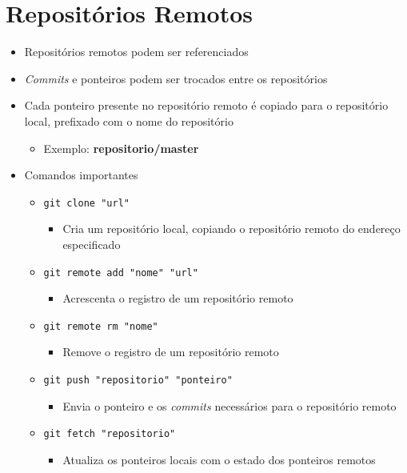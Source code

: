 \documentclass{beamer}
\newenvironment{slide}{\begin{frame}{\insertsection}}{\end{frame}}
\begin{document}
\section{Repositórios Remotos}
\begin{slide}
    \begin{itemize}
        \item Repositórios remotos podem ser referenciados
        \pause
        \item \emph{Commits} e ponteiros podem ser trocados entre os
            repositórios
        \pause
        \item Cada ponteiro presente no repositório remoto é copiado para o
            repositório local, prefixado com o nome do repositório
            \begin{itemize}
                \pause
                \item Exemplo: \textbf{repositorio/master}
            \end{itemize}
        \pause
        \item Comandos importantes
        \begin{itemize}
            \pause
            \item \texttt{git clone "url"}
            \begin{itemize}
                \item Cria um repositório local, copiando o repositório remoto
                    do endereço especificado
            \end{itemize}
            \pause
            \item \texttt{git remote add "nome"}\texttt{ "url"}
            \begin{itemize}
                \item Acrescenta o registro de um repositório remoto
            \end{itemize}
            \pause
            \item \texttt{git remote rm "nome"}
            \begin{itemize}
                \item Remove o registro de um repositório remoto
            \end{itemize}
            \pause
            \item \texttt{git push "repositorio"}\texttt{ "ponteiro"}
            \begin{itemize}
                \item Envia o ponteiro e os \emph{commits} necessários para o
                    repositório remoto
            \end{itemize}
            \pause
            \item \texttt{git fetch "repositorio"}
            \begin{itemize}
                \item Atualiza os ponteiros locais com o estado dos ponteiros
                    remotos
            \end{itemize}
        \end{itemize}
    \end{itemize}
\end{slide}
\end{document}

